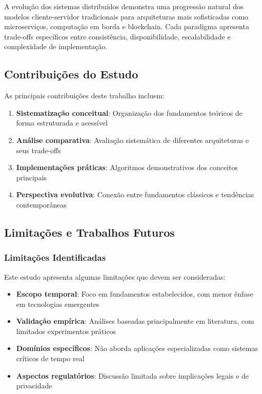 A evolução dos sistemas distribuídos demonstra uma progressão natural dos modelos cliente-servidor tradicionais para arquiteturas mais sofisticadas como microserviços, computação em borda e blockchain. Cada paradigma apresenta trade-offs específicos entre consistência, disponibilidade, escalabilidade e complexidade de implementação.

\subsection{Contribuições do Estudo}

As principais contribuições deste trabalho incluem:

\begin{enumerate}
    \item \textbf{Sistematização conceitual}: Organização dos fundamentos teóricos de forma estruturada e acessível
    \item \textbf{Análise comparativa}: Avaliação sistemática de diferentes arquiteturas e seus trade-offs
    \item \textbf{Implementações práticas}: Algoritmos demonstrativos dos conceitos principais
    \item \textbf{Perspectiva evolutiva}: Conexão entre fundamentos clássicos e tendências contemporâneas
\end{enumerate}

\subsection{Limitações e Trabalhos Futuros}

\subsubsection{Limitações Identificadas}

Este estudo apresenta algumas limitações que devem ser consideradas:

\begin{itemize}
    \item \textbf{Escopo temporal}: Foco em fundamentos estabelecidos, com menor ênfase em tecnologias emergentes
    \item \textbf{Validação empírica}: Análises baseadas principalmente em literatura, com limitados experimentos práticos
    \item \textbf{Domínios específicos}: Não aborda aplicações especializadas como sistemas críticos de tempo real
    \item \textbf{Aspectos regulatórios}: Discussão limitada sobre implicações legais e de privacidade
\end{itemize}

